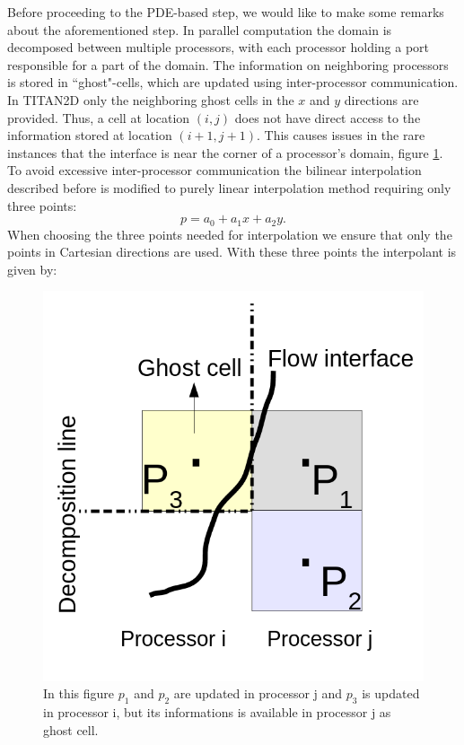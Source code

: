 \documentclass[letterpaper,10pt]{article}
\begin{document}
Before proceeding to the PDE-based step, we would like to make some remarks about the aforementioned step. 
In parallel computation the domain is decomposed between multiple processors, with each processor holding a port responsible for a part of the domain. 
The information on neighboring processors is stored in ``ghost"-cells, which are updated using inter-processor communication. In TITAN2D only the neighboring ghost
cells in the $x$ and $y$ directions are provided. Thus, a cell at location $(i,j)$ does not have direct access to the information stored at location $(i+1, j+1)$. 
This causes issues in the rare instances that the interface is near the corner of a processor's domain, figure \ref{fig:surf_interp}. To avoid 
excessive inter-processor communication the bilinear interpolation described before is modified to purely linear interpolation method requiring 
only three points:
\begin{equation}
\label{Surface}
p=a_0+a_1 x+a_2 y.
\end{equation} 
When choosing the three points needed for interpolation we ensure that only the points in Cartesian directions are used.
With these three points the interpolant is given by:
\begin{figure}[ht]
\centering
\includegraphics[scale=.25]{IMAGES/surf_interp.png}
\caption{In this figure $p_1$ and $p_2$ are updated in processor j and $p_3$ is updated in processor i, but its informations is available in processor j as ghost cell. }
                \label{fig:surf_interp}
\end{figure}
\end{document}
